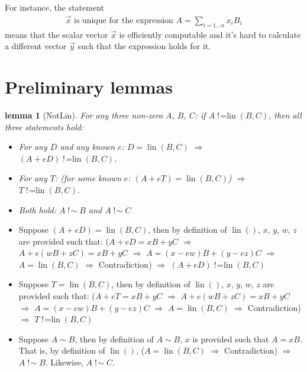 \documentclass{mathcryptology} %
\DeclareMathOperator{\notsim}{!\!\sim}
\DeclareMathOperator{\lin}{lin}
\DeclareMathOperator{\notlin}{!\!=lin}
\theoremstyle{title}
\newtheorem*{titlelemma}{lemma}
\theoremstyle{titleof}
\renewenvironment{proof}{\noindent{\bfseries Proof:} }{}
\begin{document}
    For instance, the statement
    \begin{align*}
        \vec{x} \text{ is unique for the expression } 
        A=\sum_{i=1\dots{}n} x_iB_i
    \end{align*}
    means that the scalar vector $\vec{x}$ is efficiently computable and it's hard to calculate a different vector $\vec{y}$ such that the expression holds for it.
    


\section{Preliminary lemmas}

    \begin{titlelemma}[NotLin]
        For any three non-zero $A$, $B$, $C$: if $A\notlin\left(B, C\right)$, then all three statements hold:
        \begin{itemize}
            \item[a)] For any $D$ and any known $e$: $D=\lin\left(B, C\right)$ $\Rightarrow$ $\left(A+eD\right)\notlin\left(B, C\right)$.
            \item[b)] For any $T$: (for some known $e$: $\left(A+eT\right)=\lin\left(B, C\right)$) $\Rightarrow$ $T\notlin\left(B, C\right)$.
            \item[c)] Both hold: $A\notsim B$ and $A\notsim C$
        \end{itemize}
    \end{titlelemma}
    \begin{proof}
        \begin{itemize}
            \item[a)] Suppose $\left(A+eD\right)=\lin\left(B, C\right)$, then by definition of $\lin()$, $x$, $y$, $w$, $z$ are provided such that: ($A+eD=xB+yC$ $\Rightarrow$ $A+e\left(wB+zC\right)=xB+yC$ $\Rightarrow$ $A=\left(x-ew\right)B+\left(y-ez\right)C$ $\Rightarrow$ $A=\lin\left(B, C\right)$ $\Rightarrow$ Contradiction) $\Rightarrow$ $\left(A+eD\right)\notlin\left(B, C\right)$
            \item[b)] Suppose $T=\lin\left(B, C\right)$, then by definition of $\lin()$, $x$, $y$, $w$, $z$ are provided such that: ($A+eT=xB+yC$ $\Rightarrow$ $A+e\left(wB+zC\right)=xB+yC$ $\Rightarrow$ $A=\left(x-ew\right)B+\left(y-ez\right)C$ $\Rightarrow$ $A=\lin\left(B, C\right)$ $\Rightarrow$ Contradiction) $\Rightarrow$ $T\notlin\left(B, C\right)$
            \item[c)] Suppose $A\sim B$, then by definition of $A\sim B$, $x$ is provided such that $A=xB$. That is, by definition of $\lin()$, ($A=\lin\left(B, C\right)$ $\Rightarrow$ Contradiction) $\Rightarrow$ $A\notsim B$. Likewise, $A\notsim C$.
        \end{itemize}
    \end{proof}
\end{document}
